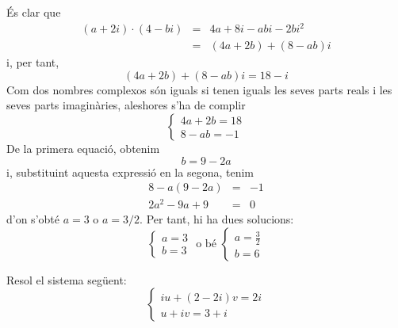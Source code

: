 \begin{solucio}
És clar que
\begin{eqnarray*}
(a+2i)\cdot (4-bi) &=&4a+8i-abi-2bi^{2} \\
&=&(4a+2b)+(8-ab)i
\end{eqnarray*}
i, per tant,
\begin{equation*}
(4a+2b)+(8-ab)i=18-i
\end{equation*}
Com dos nombres complexos són iguals si tenen iguals les seves parts reals i les seves parts imaginàries, aleshores s’ha de complir
\begin{equation*}
\left\{
\begin{array}{l}
4a+2b=18 \\
8-ab=-1
\end{array}
\right.
\end{equation*}
De la primera equació, obtenim
\begin{equation*}
b=9-2a
\end{equation*}
i, substituint aquesta expressió en la segona, tenim
\begin{eqnarray*}
8-a(9-2a) &=&-1 \\
2a^{2}-9a+9 &=&0
\end{eqnarray*}
d’on s’obté $a=3$ o $a=3/2$. Per tant, hi ha dues solucions:
\begin{equation*}
\left\{
\begin{array}{l}
a=3 \\
b=3
\end{array}
\right. \text{ \ \ \ o bé \ \ \ }\left\{
\begin{array}{l}
a=\frac{3}{2} \\
b=6
\end{array}
\right.
\end{equation*}
\end{solucio}

\begin{exemple}
Resol el sistema següent:
\begin{equation*}
\left\{
\begin{array}{l}
iu+(2-2i)v=2i \\
u+iv=3+i
\end{array}
\right.
\end{equation*}
\end{exemple}

